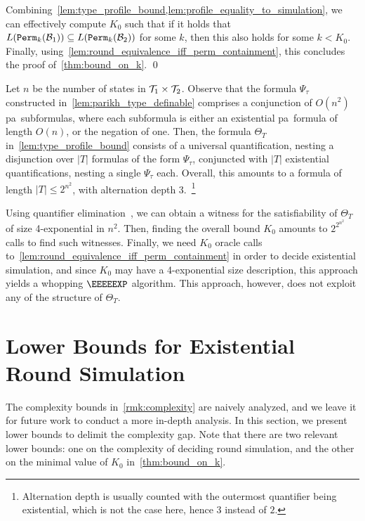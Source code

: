 Combining~\cref{lem:type_profile_bound,lem:profile_equality_to_simulation}, we can effectively compute $K_0$ such that if it holds that
$L({\mathtt{Perm}}_{k}(\mathcal{B}_1)) \subseteq L({\mathtt{Perm}}_{k}(\mathcal{B}_2))$
for some $k$, then this also holds for some $k<K_0$. Finally, using~\cref{lem:round_equivalence_iff_perm_containment}, this concludes the proof of~\cref{thm:bound_on_k}. \qed

\begin{remark}
\label{rmk:complexity}
Let $n$ be the number of states in $\mathcal{T}_1\times \mathcal{T}_2$. Observe that the formula $\Psi_\tau$ constructed in~\cref{lem:parikh_type_definable} comprises a conjunction of $O(n^2)$ \gls{pa}~subformulas, where each subformula is either an existential \gls{pa}~formula of length $O(n)$, or the negation of one. Then, the formula $\Theta_T$ in~\cref{lem:type_profile_bound} consists of a universal quantification, nesting a disjunction over $|T|$ formulas of the form $\Psi_\tau$, conjuncted with $|T|$ existential quantifications, nesting a single $\Psi_\tau$ each.
Overall, this amounts to a formula of length $|T|\le 2^{n^2}$, with alternation depth 3.~\footnote{Alternation depth is usually counted with the outermost quantifier being existential, which is not the case here, hence $3$ instead of $2$.}

Using quantifier elimination~\cite{Cooper1972,Oppen1978}, we can obtain a witness for the satisfiability of $\Theta_T$ of size 4-exponential in $n^2$. Then, finding the overall bound $K_0$ amounts to $2^{2^{n^2}}$ calls to find such witnesses. Finally, we need $K_0$ oracle calls to~\cref{lem:round_equivalence_iff_perm_containment} in order to decide existential simulation, and since $K_0$ may have a 4-exponential size description, this approach yields a whopping $\EEEEEXP$ algorithm. 
This approach, however, does not exploit any of the structure of $\Theta_T$.
\end{remark}

\section{Lower Bounds for Existential Round Simulation}
\label{sec:lower_bounds_existential}
The complexity bounds in~\cref{rmk:complexity} are naively analyzed, and we leave it for future work to conduct a more in-depth analysis. In this section, we present lower bounds to delimit the complexity gap. Note that there are two relevant lower bounds: one on the complexity of deciding round simulation, and the other on the minimal value of $K_0$ in~\cref{thm:bound_on_k}.

